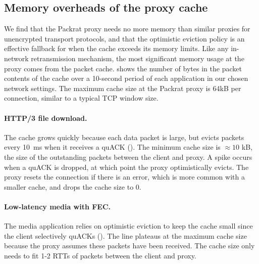 

\subsection{Memory overheads of the proxy cache}
\label{sec:packrat:evaluation:memory-overheads}



We find that the Packrat proxy needs no more memory
than similar proxies for unencrypted transport protocols, and that the optimistic
eviction policy is an effective fallback for when the cache exceeds its memory limits.
Like any in-network retransmission mechanism,
the most significant memory usage at the proxy comes from the packet
cache.  shows the number of bytes in the packet contents of
the cache over a 10-second period of each application in our chosen
network settings. The maximum cache size
at the Packrat proxy is 64kB per connection, similar to a typical TCP window size.

\paragraph{HTTP/3 file download.}

The cache grows quickly because each data packet is large, but evicts
packets every 10~ms when
it receives a quACK (). The minimum cache size is
$\approx\!10$ kB, the size of the outstanding packets between the client and
proxy. A spike occurs when a quACK is dropped, at which point the proxy
optimistically evicts. The proxy resets the connection if there is an
error, which is more common with a smaller cache, and drops the cache
size to 0.

\paragraph{Low-latency media with FEC.}

The media application relies on optimistic eviction to keep the cache small
since the client selectively quACKs (). The
line plateaus at the maximum cache size because the proxy
assumes these packets have been received. The cache size only needs to fit 1-2
RTTs of packets between the client and proxy.

